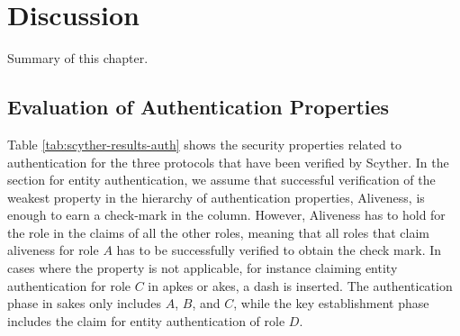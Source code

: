 \chapter{Discussion}
\label{chp:discussion}

Summary of this chapter.


\section{Evaluation of Authentication Properties}


Table \ref{tab:scyther-results-auth} shows the security properties related to authentication for the three protocols that have been verified by Scyther. In the section for entity authentication, we assume that successful verification of the weakest property in the hierarchy of authentication properties, Aliveness, is enough to earn a check-mark in the column. However, Aliveness has to hold for the role in the claims of all the other roles, meaning that all roles that claim aliveness for role $A$ has to be successfully verified to obtain the check mark. In cases where the property is not applicable, for instance claiming entity authentication for role $C$ in \gls{apkes} or \gls{akes}, a dash is inserted. The authentication phase in \gls{sakes} only includes $A$, $B$, and $C$, while the key establishment phase includes the claim for entity authentication of role $D$.

\begin{table}[h]
\centering
{}
\caption{Table of the security properties for authentication that are satisfied in the different protocols.}
\label{tab:scyther-results-auth}
\end{table}

